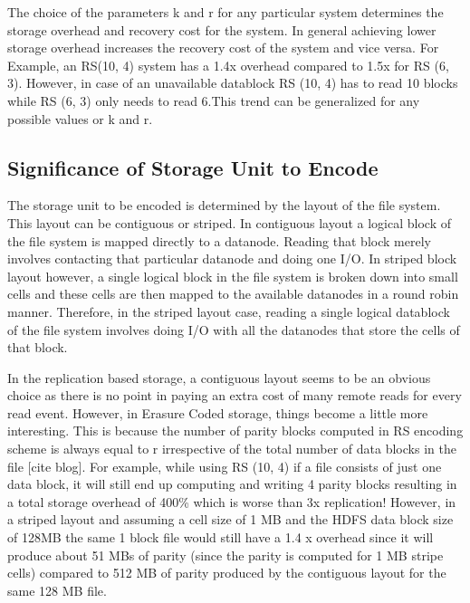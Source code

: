 \documentclass{sig-alternate-05-2015}
\begin{document}
The choice of the parameters k and r for any particular system determines the storage overhead and recovery cost for the system. In general achieving lower storage overhead increases the recovery cost of the system and vice versa. For Example, an RS(10, 4) system has a 1.4x overhead compared to 1.5x for RS (6, 3). However, in case of an unavailable datablock RS (10, 4) has to read 10 blocks while RS (6, 3) only needs to read 6.This trend can be generalized for any possible values or k and r. 



\subsection{Significance of Storage Unit to Encode}

The storage unit to be encoded is determined by the layout of the file system. This layout can be contiguous or striped. In contiguous layout a logical block of the file system is mapped directly to a datanode. Reading that block merely involves contacting that particular datanode and doing one I/O.  In striped block layout however, a single logical block in the file system is broken down into small cells and these cells are then mapped to the available datanodes in a round robin manner. Therefore, in the striped layout case, reading a single logical datablock of the file system involves doing I/O with all the datanodes that store the cells of that block. 


In the replication based storage, a contiguous layout seems to be an obvious choice as there is no point in paying an extra cost of many remote reads for every read event. However, in Erasure Coded storage, things become a little more interesting. This is because the number of parity blocks computed in RS encoding scheme is always equal to r irrespective of the total number of data blocks in the file [cite blog]. For example, while using RS (10, 4) if a file consists of just one data block, it will still end up computing and writing 4 parity blocks resulting in a total storage overhead of 400\% which is worse than 3x replication! However, in a striped layout and assuming a cell size of 1 MB and the HDFS data block size of 128MB the same 1 block file would still have a 1.4 x overhead since it will produce about 51 MBs of parity (since the parity is computed for 1 MB stripe cells) compared to 512 MB of parity produced by the contiguous layout for the same 128 MB file. 
\end{document}
